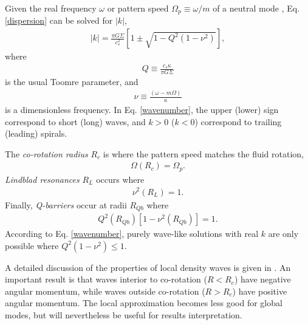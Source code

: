 Given the real frequency $\omega$ or pattern speed $\Omega_p\equiv  
\omega/m$ of a neutral mode 
, Eq. \ref{dispersion} can be solved 
for $|k|$, 
\begin{align}\label{wavenumber}
  |k| = \frac{\pi G \Sigma}{c_s^2}\left[1 \pm \sqrt{1 -
      Q^2(1-\nu^2)}\right], 
\end{align}
where 
\begin{align}
  Q \equiv \frac{c_s\kappa}{\pi G \Sigma}
\end{align}
is the usual Toomre parameter, and
\begin{align}
  \nu \equiv \frac{(\omega - m\Omega)}{\kappa}
\end{align}
is a dimensionless frequency. In
Eq. \ref{wavenumber}, the upper (lower) sign correspond to short
(long) waves, and $k>0$ ($k<0$) correspond to trailing (leading)
spirals.    

The \emph{co-rotation radius} $R_c$ is where the pattern speed matches
the fluid rotation,
\begin{align}
  \Omega(R_c) = \Omega_p.
\end{align}
\emph{Lindblad resonances} $R_L$ occurs where
\begin{align}
  \nu^2(R_L) = 1. 
\end{align}
Finally, \emph{Q-barriers} occur at radii $R_{Qb}$ where
\begin{align}
  Q^2(R_{Qb})\left[1-\nu^2(R_{Qb})\right] = 1.  
\end{align}
According to Eq. \ref{wavenumber}, purely wave-like solutions with
real $k$ are only possible where $Q^2(1-\nu^2)\leq1$.  

A detailed discussion of the properties of local density waves 
is given in \cite{shu91}. An important result is that
waves interior to co-rotation ($R<R_c$) have negative angular momentum, while
waves outside co-rotation ($R>R_c$) have positive angular
momentum. The local approximation becomes less good for global modes,
but will nevertheless be useful for results interpretation.   
